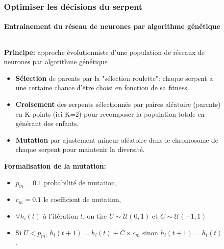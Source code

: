 \documentclass[10pt]{beamer}
\begin{document}
\begin{frame}
\frametitle{Optimiser les décisions du serpent}
\framesubtitle{Entrainement du réseau de neurones par algorithme génétique}
\begin{columns}[T]
\begin{column}{0.60\textwidth}
\footnotesize

\textbf{Principe:} approche évolutionniste d'une population de réseaux de neurones par algorithme génétique
\begin{itemize}
  \item \textbf{Sélection} de parents par la "sélection roulette": chaque serpent a une certaine chance d'être choisi en fonction de sa fitness.
  \item \textbf{Croisement} des serpents sélectionnés par paires aléatoire (parents) en K points (ici K=2) pour recomposer la population totale en générant des enfants.
  \item \textbf{Mutation} par ajustement mineur aléatoire dans le chromosome de chaque serpent pour maintenir la diversité.
\end{itemize}

\textbf{Formalisation de la mutation:}
\scriptsize
\begin{itemize}
\item $p_m=0.1$ probabilité de mutation,
\item $c_m=0.1$ le coefficient de mutation,
\item $\forall h_i(t)$ à l'itération $t$, on tire $U \sim \mathcal{U}(0, 1)$ et $C \sim \mathcal{U}(-1, 1)$
\item Si $U<p_m$, $h_i(t+1)=h_i(t)+C\times c_m$ sinon $h_i(t+1)=h_i(t)$.
\end{itemize}
\end{column}

\begin{column}{0.40\textwidth}

\begin{figure}
\centering
\end{figure}
\end{column}
\end{columns}
\end{frame}
\end{document}
